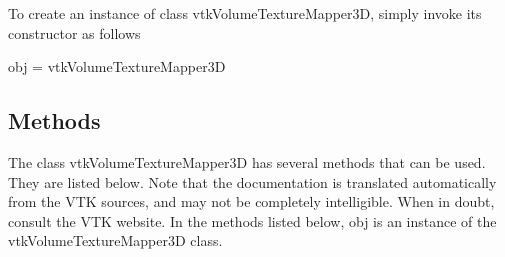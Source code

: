 To create an instance of class vtk\-Volume\-Texture\-Mapper3\-D, simply invoke its constructor as follows \begin{DoxyVerb}  obj = vtkVolumeTextureMapper3D
\end{DoxyVerb}
 \hypertarget{vtkwidgets_vtkxyplotwidget_Methods}{}\subsection{Methods}\label{vtkwidgets_vtkxyplotwidget_Methods}
The class vtk\-Volume\-Texture\-Mapper3\-D has several methods that can be used. They are listed below. Note that the documentation is translated automatically from the V\-T\-K sources, and may not be completely intelligible. When in doubt, consult the V\-T\-K website. In the methods listed below, {\ttfamily obj} is an instance of the vtk\-Volume\-Texture\-Mapper3\-D class. 
